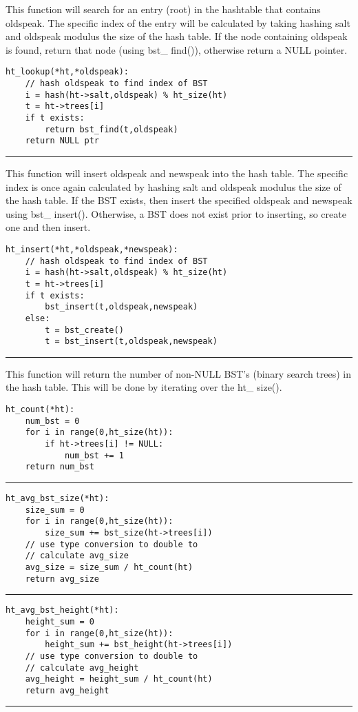 \documentclass[
	12pt, %
]{fphw}
\begin{document}
This function will search for an entry (root) in the hashtable that contains oldspeak. The specific index of the entry will be calculated by taking hashing salt and oldspeak modulus the size of the hash table. If the node containing oldspeak is found, return that node (using bst\_ find()), otherwise return a NULL pointer.
\begin{lstlisting}[mathescape=true]
ht_lookup(*ht,*oldspeak):
	// hash oldspeak to find index of BST
	i = hash(ht->salt,oldspeak) % ht_size(ht)
	t = ht->trees[i]
	if t exists:
		return bst_find(t,oldspeak)
	return NULL ptr
\end{lstlisting}
\noindent\rule{6.3in}{0.4pt}

This function will insert oldspeak and newspeak into the hash table. The specific index is once again calculated by hashing salt and oldspeak modulus the size of the hash table. If the BST exists, then insert the specified oldspeak and newspeak using bst\_ insert(). Otherwise, a BST does not exist prior to inserting, so create one and then insert.
\begin{lstlisting}[mathescape=true]
ht_insert(*ht,*oldspeak,*newspeak):
	// hash oldspeak to find index of BST
	i = hash(ht->salt,oldspeak) % ht_size(ht)
	t = ht->trees[i]
	if t exists:
		bst_insert(t,oldspeak,newspeak)
	else:
		t = bst_create()
		t = bst_insert(t,oldspeak,newspeak)
\end{lstlisting}
\noindent\rule{6.3in}{0.4pt}

This function will return the number of non-NULL BST's (binary search trees) in the hash table. This will be done by iterating over the ht\_ size().
\begin{lstlisting}[mathescape=true]
ht_count(*ht):
	num_bst = 0
	for i in range(0,ht_size(ht)):
		if ht->trees[i] != NULL:
			num_bst += 1
	return num_bst
\end{lstlisting}
\noindent\rule{6.3in}{0.4pt}

\begin{lstlisting}[mathescape=true]
ht_avg_bst_size(*ht):
	size_sum = 0
	for i in range(0,ht_size(ht)):
		size_sum += bst_size(ht->trees[i])
	// use type conversion to double to
	// calculate avg_size
	avg_size = size_sum / ht_count(ht)
	return avg_size
\end{lstlisting}
\noindent\rule{6.3in}{0.4pt}

\begin{lstlisting}[mathescape=true]
ht_avg_bst_height(*ht):
	height_sum = 0
	for i in range(0,ht_size(ht)):
		height_sum += bst_height(ht->trees[i])
	// use type conversion to double to
	// calculate avg_height
	avg_height = height_sum / ht_count(ht)
	return avg_height
\end{lstlisting}
\noindent\rule{6.3in}{0.4pt}
\end{document}
